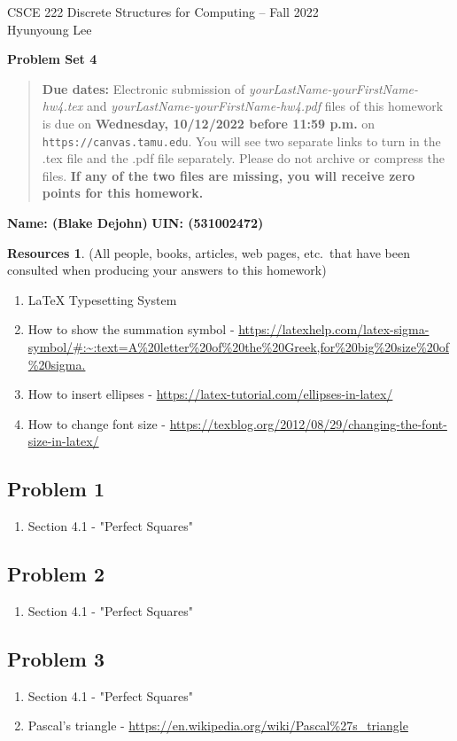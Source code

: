 \documentclass{article}
\theoremstyle{definition}
\newtheorem*{resources}{Resources}
\newcommand{\name}[2]{\noindent\textbf{Name: #1}\hfill \textbf{UIN: #2}
  \newcommand{\myName}{#1}
  \newcommand{\myUIN}{#2}
}
\newcommand{\problemset}[1]{\begin{center}\textbf{Problem Set #1}\end{center}}
\newcommand{\duedate}[1]{\begin{quote}\textbf{Due dates:} Electronic
    submission of \textsl{yourLastName-yourFirstName-hw4.tex} and 
    \textsl{yourLastName-yourFirstName-hw4.pdf} files of this homework is due on
    \textbf{#1} on \texttt{https://canvas.tamu.edu}. You will see two separate links
    to turn in the .tex file and the .pdf file separately. Please do not archive or compress the files.  
    \textbf{If any of the two files are missing, you will receive zero points for this homework.}\end{quote} }
\begin{document}
\begin{center}
{\large
CSCE 222 Discrete Structures for Computing -- Fall 2022\\[.5ex]
Hyunyoung Lee\\}
\end{center}
\problemset{4}
\duedate{Wednesday, 10/12/2022 before 11:59 p.m.}
\name{ (Blake Dejohn) }{ (531002472) } %
\begin{resources} (All people, books, articles, web pages, etc.\ that
  have been consulted when producing your answers to this homework)
\begin{enumerate}
\subsection*{Resources Overall (used for the whole document)}
\item LaTeX Typesetting System
\item How to show the summation symbol - \url{https://latexhelp.com/latex-sigma-symbol/#:~:text=A%20letter%20of%20the%20Greek,for%20big%20size%20of%20sigma.}
\item How to insert ellipses - \url{https://latex-tutorial.com/ellipses-in-latex/}
\item How to change font size - \url{https://texblog.org/2012/08/29/changing-the-font-size-in-latex/}

\end{enumerate}
\subsection*{Problem 1}
\begin{enumerate}
\item Section 4.1 - "Perfect Squares"
\end{enumerate}
\subsection*{Problem 2}
\begin{enumerate}
\item Section 4.1 - "Perfect Squares"
\end{enumerate}
\subsection*{Problem 3}
\begin{enumerate}
\item Section 4.1 - "Perfect Squares"
\item Pascal's triangle - \url{https://en.wikipedia.org/wiki/Pascal%27s_triangle}
\end{enumerate}

\end{resources}
\end{document}
